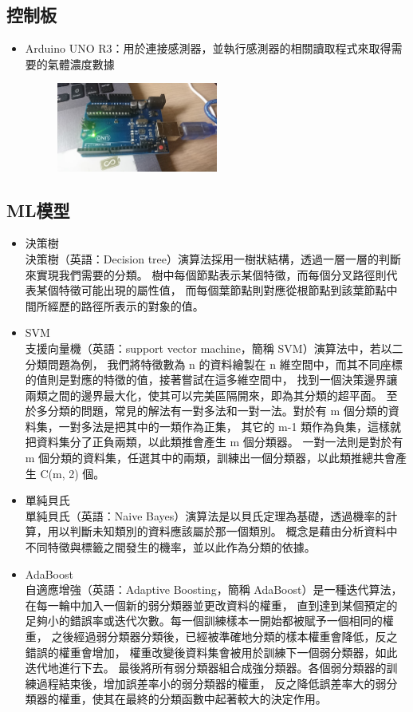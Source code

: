 	\subsection{控制板}
	\begin{itemize}
		\item Arduino UNO R3：用於連接感測器，並執行感測器的相關讀取程式來取得需要的氣體濃度數據
		\begin{figure}[H]
			\centering
			\includegraphics[width=0.5\textwidth]{pic/Uno.png}
		\end{figure}
	\end{itemize}
	\subsection{ML模型}
	\begin{itemize}
		\item 決策樹\\
			決策樹（英語：Decision tree）演算法採用一樹狀結構，透過一層一層的判斷來實現我們需要的分類。
			樹中每個節點表示某個特徵，而每個分叉路徑則代表某個特徵可能出現的屬性值，
			而每個葉節點則對應從根節點到該葉節點中間所經歷的路徑所表示的對象的值。
		\item SVM\\
			支援向量機（英語：support vector machine，簡稱 SVM）演算法中，若以二分類問題為例，
			我們將特徵數為 n 的資料繪製在 n 維空間中，而其不同座標的值則是對應的特徵的值，接著嘗試在這多維空間中，
			找到一個決策邊界讓兩類之間的邊界最大化，使其可以完美區隔開來，即為其分類的超平面。
			至於多分類的問題，常見的解法有一對多法和一對一法。對於有 m 個分類的資料集，一對多法是把其中的一類作為正集，
			其它的 m-1 類作為負集，這樣就把資料集分了正負兩類，以此類推會產生 m 個分類器。
			一對一法則是對於有 m 個分類的資料集，任選其中的兩類，訓練出一個分類器，以此類推總共會產生 C(m, 2) 個。
		\item 單純貝氏\\
			單純貝氏（英語：Naive Bayes）演算法是以貝氏定理為基礎，透過機率的計算，用以判斷未知類別的資料應該屬於那一個類別。
			概念是藉由分析資料中不同特徵與標籤之間發生的機率，並以此作為分類的依據。
		\item AdaBoost\\
			自適應增強（英語：Adaptive Boosting，簡稱 AdaBoost）是一種迭代算法，在每一輪中加入一個新的弱分類器並更改資料的權重，
			直到達到某個預定的足夠小的錯誤率或迭代次數。每一個訓練樣本一開始都被賦予一個相同的權重，
			之後經過弱分類器分類後，已經被準確地分類的樣本權重會降低，反之錯誤的權重會增加，
			權重改變後資料集會被用於訓練下一個弱分類器，如此迭代地進行下去。
			最後將所有弱分類器組合成強分類器。各個弱分類器的訓練過程結束後，增加誤差率小的弱分類器的權重，
			反之降低誤差率大的弱分類器的權重，使其在最終的分類函數中起著較大的決定作用。
	\end{itemize}